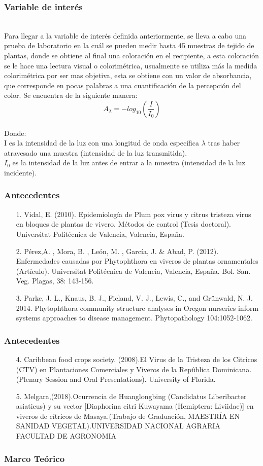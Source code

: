 \documentclass[11pt]{beamer}
\begin{document}
\begin{frame}
\frametitle{Variable de interés}
~\\Para llegar a la variable de interés definida anteriormente, se lleva a cabo una prueba de laboratorio en la cuál se pueden medir hasta 45 muestras de tejido de plantas, donde se obtiene al final una coloración en el recipiente, a esta coloración se le hace una lectura visual o colorimétrica, usualmente se utiliza más la medida colorimétrica por ser mas objetiva, esta se obtiene con un valor de absorbancia, que corresponde en pocas palabras a una cuantificación de la percepción del color. Se encuentra de la siguiente manera:
\[ A_\lambda=-log_{10} \left( \frac{I}{I_0}\right) \]
~\\Donde:
~\\I es la intensidad de la luz con una longitud de onda específica $\lambda$ tras haber atravesado una muestra (intensidad de la luz transmitida).
~\\$I_0$  es la intensidad de la luz antes de entrar a la muestra (intensidad de la luz incidente).
\end{frame}

\begin{frame}
\frametitle{Antecedentes}
\begin{itemize}
\item[1.]Vidal, E. (2010). Epidemiología de Plum pox virus y citrus tristeza virus en bloques de plantas de vivero. Métodos de control (Tesis doctoral). Universitat Politécnica de Valencia, Valencia, España.
\item[2.]Pérez,A. , Mora, B. , León, M. , García, J. \& Abad, P. (2012). Enfermedades causadas por Phytophthora en viveros de plantas ornamentales (Artículo). Universitat Politécnica de Valencia, Valencia, España. Bol. San. Veg. Plagas, 38: 143-156.
\item[3.]Parke, J. L., Knaus, B. J., Fieland, V. J., Lewis, C., and Grünwald, N. J.
2014. Phytophthora community structure analyses in Oregon nurseries
inform systems approaches to disease management. Phytopathology
104:1052-1062.
\end{itemize}
\end{frame}

\begin{frame}
\frametitle{Antecedentes}
\begin{itemize}
\item[4.]Caribbean food crops society. (2008).El Virus de la Tristeza de los Citricos (CTV) en Plantaciones Comerciales y Viveros
de la Repûblica Dominicana.(Plenary Session and Oral Presentations). University of Florida.
\item[5.]Melgara,(2018).Ocurrencia de Huanglongbing (Candidatus Liberibacter asiaticus) y su vector [Diaphorina citri Kuwayama (Hemiptera: Liviidae)] en viveros de cítricos de Masaya.(Trabajo de Graduación, MAESTRÍA EN SANIDAD VEGETAL).UNIVERSIDAD NACIONAL AGRARIA
FACULTAD DE AGRONOMIA
\end{itemize}
\end{frame}

\begin{frame}
\frametitle{Marco Teórico}
\end{frame}
\end{document}
